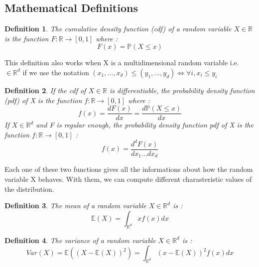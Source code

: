 \documentclass{article}
\begin{document}
	\subsection{Mathematical Definitions}
	\newtheorem{definition}{Definition}
	\newtheorem{property}{Property}
	\begin{definition}
	The cumulative density function (cdf) of a random variable $X \in \mathbb{R}$ is the function $F : \mathbb{R} \to [0,1]$ where :
	\begin{equation*}
	F(x) = \mathbb{P}(X\leq x)
	\end{equation*}	
	\end{definition}
	
	This definition also works when X is a multidimensional random	variable i.e. $\in \mathbb{R}^d$ if we use the notation $(x_1,...,x_d) \leq (y_1,...,y_d) \Leftrightarrow \forall i, x_i \leq y_i$	
	
	
	\begin{definition}
	If the cdf of $X \in \mathbb{R}$ is differentiable, the probability density function (pdf) of X is the function $f : \mathbb{R} \to [0,1]$ where :
	\begin{equation*}
	f(x) = \frac{dF(x)}{dx} = \frac{d\mathbb{P}(X\leq x)}{dx}
	\end{equation*}
	If $X \in \mathbb{R}^d$ and F is regular enough, the probability density function pdf of X is the function $f : \mathbb{R} \to [0,1]$ :
	\begin{equation*}
	f(x) = \frac{d^d F(x)}{dx_1...dx_d}
	\end{equation*}
	\end{definition}	
	
	
	
	Each one of these two functions gives all the informations about how the random variable X behaves. With them, we can compute different charasteristic values of the distribution.
	
	\begin{definition}
	The mean of a random variable $X \in \mathbb{R}^d$ is :
	\begin{equation*}
	\mathbb{E}(X) = \int_{\mathbb{R}^d} xf(x)dx
	\end{equation*}
	\end{definition} 
	
	\begin{definition}
	The variance of a random variable $X \in \mathbb{R}^d$ is :
	\begin{equation*}
	Var(X) = \mathbb{E}((X-\mathbb{E}(X))^2) = \int_{\mathbb{R}^d} (x-\mathbb{E}(X))^2f(x)dx
	\end{equation*}
	\end{definition}
	
\end{document}
